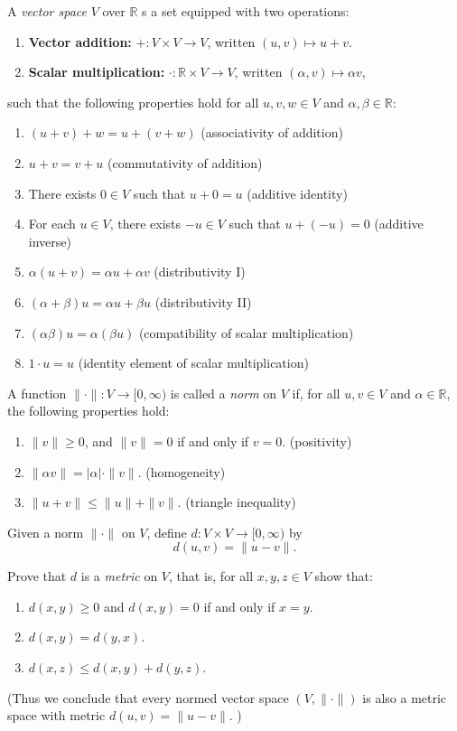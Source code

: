 \begin{problem}[10 pts]  
  A \emph{vector space} $V$ over $\mathbb{R}$ s a set 
equipped with two operations:
\begin{enumerate}
  \item \textbf{Vector addition:} $+: V \times V \to V$, written $(u,v) \mapsto u+v$.
  \item \textbf{Scalar multiplication:} $\cdot : \mathbb{R} \times V \to V$, written $(\alpha,v) \mapsto \alpha v$,
\end{enumerate}
such that the following properties hold for all $u,v,w \in V$ and $\alpha,\beta \in \mathbb{R}$:
\begin{enumerate}
  \item[(VS1)] $(u+v)+w = u+(v+w)$ \hfill (associativity of addition)
  \item[(VS2)] $u+v = v+u$ \hfill (commutativity of addition)
  \item[(VS3)] There exists $0 \in V$ such that $u+0=u$ \hfill (additive identity)
  \item[(VS4)] For each $u \in V$, there exists $-u \in V$ such that $u+(-u)=0$ \hfill (additive inverse)
  \item[(VS5)] $\alpha(u+v) = \alpha u + \alpha v$ \hfill (distributivity I)
  \item[(VS6)] $(\alpha+\beta)u = \alpha u + \beta u$ \hfill (distributivity II)
  \item[(VS7)] $(\alpha\beta)u = \alpha(\beta u)$ \hfill (compatibility of scalar multiplication)
  \item[(VS8)] $1 \cdot u = u$ \hfill (identity element of scalar multiplication)
\end{enumerate}

A function $\|\cdot\| : V \to [0,\infty)$ is called a \emph{norm} on $V$ if, 
for all $u,v \in V$ and $\alpha \in \mathbb{R}$, the following properties hold:
\begin{enumerate}
  \item[(N1)] $\|v\| \geq 0$, and $\|v\| = 0$ if and only if $v=0$. \hfill (positivity)
  \item[(N2)] $\|\alpha v\| = |\alpha| \cdot \|v\|$. \hfill (homogeneity)
  \item[(N3)] $\|u+v\| \leq \|u\| + \|v\|$. \hfill (triangle inequality)
\end{enumerate}

Given a norm $\|\cdot\|$ on $V$, define $d : V \times V \to [0,\infty)$ by
\[
d(u,v) = \|u-v\|.
\]


 Prove that $d$ is a \emph{metric} on $V$, that is, for all $x,y,z \in V$ show that:
  \begin{enumerate}
    \item $d(x,y) \geq 0$ and $d(x,y)=0$ if and only if $x=y$.
    \item $d(x,y) = d(y,x)$.
    \item $d(x,z) \leq d(x,y) + d(y,z)$.
  \end{enumerate}
(Thus we conclude that every normed vector space $(V,\|\cdot\|)$ is also a metric space with metric $d(u,v)=\|u-v\|$.
)
\end{problem}
